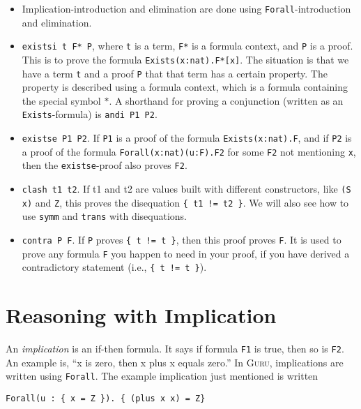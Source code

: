 \documentclass{book}[12pt]
\newcommand{\guru}[0]{\textsc{Guru}\xspace}
\begin{document}
\begin{itemize}
\item Implication-introduction and elimination are done using
\texttt{Forall}-introduction and elimination.

\item \texttt{existsi t F* P}, where \texttt{t} is a term, \texttt{F*}
is a formula context, and \texttt{P} is a proof.  This is to prove the
formula \texttt{Exists(x:nat).F*[x]}.  The situation is that we have a
term \texttt{t} and a proof \texttt{P} that that term has a certain
property.  The property is described using a formula context, which is
a formula containing the special symbol $*$.  A shorthand for proving
a conjunction (written as an \texttt{Exists}-formula) is \texttt{andi P1 P2}.

\item \texttt{existse P1 P2}.  If \texttt{P1} is a proof of
the formula \texttt{Exists(x:nat).F}, and if \texttt{P2} is a proof of the formula
\texttt{Forall(x:nat)(u:F).F2} for some \texttt{F2} not mentioning
\texttt{x}, then the \texttt{existse}-proof also proves \texttt{F2}.

\item \texttt{clash t1 t2}.  If t1 and t2 are values built with
different constructors, like \texttt{(S x)} and \texttt{Z}, this
proves the disequation \texttt{\{ t1 != t2 \}}.  We will also see how
to use \texttt{symm} and \texttt{trans} with disequations.

\item \texttt{contra P F}.  If \texttt{P} proves \texttt{\{ t != t
\}}, then this proof proves \texttt{F}.  It is used to prove any
formula \texttt{F} you happen to need in your proof, if you have
derived a contradictory statement (i.e., \texttt{\{ t != t \}}).

\end{itemize}

\section{Reasoning with Implication}

An \emph{implication} is an if-then formula.  It says if formula
\texttt{F1} is true, then so is \texttt{F2}.  An example is, ``x is
zero, then x plus x equals zero.''  In \guru, implications are written
using \texttt{Forall}.  The example implication just mentioned is written

\begin{verbatim}
Forall(u : { x = Z }). { (plus x x) = Z}
\end{verbatim}
\end{document}
